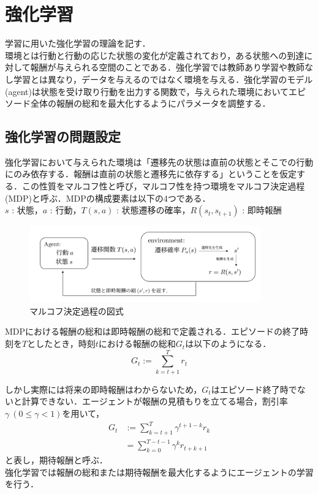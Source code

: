 \documentclass[a4paper,12pt]{jsreport}
\theoremstyle{definition}
\begin{document}
\chapter{強化学習}
学習に用いた強化学習の理論を記す．\\
環境とは行動と行動の応じた状態の変化が定義されており，ある状態への到達に対して報酬が与えられる空間のことである．強化学習では教師あり学習や教師なし学習とは異なり，データを与えるのではなく環境を与える．強化学習のモデル(agent)は状態を受け取り行動を出力する関数で，与えられた環境においてエピソード全体の報酬の総和を最大化するようにパラメータを調整する．
\section{強化学習の問題設定} 
強化学習において与えられた環境は「遷移先の状態は直前の状態とそこでの行動にのみ依存する．報酬は直前の状態と遷移先に依存する」ということを仮定する．この性質をマルコフ性と呼び，マルコフ性を持つ環境をマルコフ決定過程(MDP)と呼ぶ．MDPの構成要素は以下の4つである．\\
$s$ : 状態，$a$ : 行動，$T(s,a)$ : 状態遷移の確率，$R(s_t,s_{t+1})$ : 即時報酬\textbf{}
\begin{figure}[h]
    \centering
    \includegraphics[width=10cm]{MDP.png}
    \caption{マルコフ決定過程の図式}
    \label{fig:MDP}
\end{figure}
\clearpage

MDPにおける報酬の総和は即時報酬の総和で定義される．エピソードの終了時刻を$T$としたとき，時刻$t$における報酬の総和$G_t$は以下のようになる．
\begin{equation}
    G_t:=\sum_{k=t+1}^Tr_t
\end{equation}

しかし実際には将来の即時報酬はわからないため，$G_t$はエピソード終了時でないと計算できない．エージェントが報酬の見積もりを立てる場合，割引率$\gamma\ (0\leq \gamma<1)$を用いて，
\begin{align}
    G_t&:=\sum_{k=t+1}^T \gamma^{t+1-k} r_k\\
    &=\sum_{k=0}^{T-t-1} \gamma^{k} r_{t+k+1}
\end{align}
と表し，期待報酬と呼ぶ．\\ 
強化学習では報酬の総和または期待報酬を最大化するようにエージェントの学習を行う．
\end{document}
